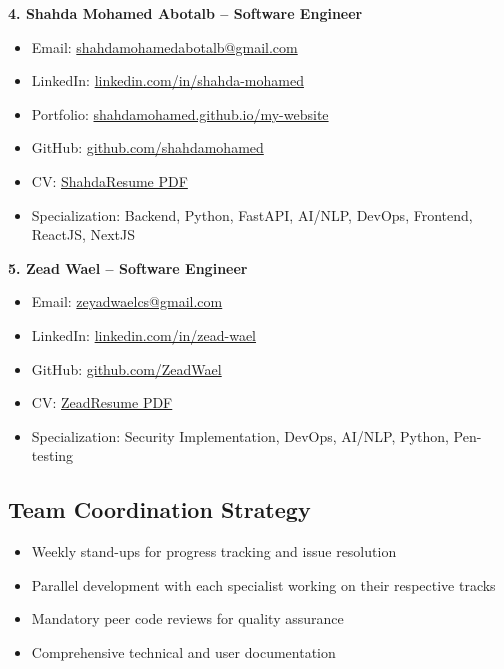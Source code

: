 \documentclass[12pt,a4paper]{article}
\begin{document}
\textbf{4. Shahda Mohamed Abotalb – Software Engineer}
\begin{itemize}
    \item Email: \href{mailto:shahdamohamedabotalb@gmail.com}{shahdamohamedabotalb@gmail.com}
    \item LinkedIn: \href{https://www.linkedin.com/in/shahda-mohamed-178537280}{linkedin.com/in/shahda-mohamed}
    \item Portfolio: \href{https://shahdamohamed.github.io/my-website}{shahdamohamed.github.io/my-website}
    \item GitHub: \href{https://github.com/shahdamohamed}{github.com/shahdamohamed}
    \item CV: \href{https://shahdamohamed.github.io/my-website/assets/resume.pdf}{ShahdaResume PDF}
    \item Specialization: Backend, Python, FastAPI, AI/NLP, DevOps, Frontend, ReactJS, NextJS
\end{itemize}

\textbf{5. Zead Wael – Software Engineer}
\begin{itemize}
    \item Email: \href{mailto:zeyadwaelcs@gmail.com}{zeyadwaelcs@gmail.com}
    \item LinkedIn: \href{https://www.linkedin.com/in/zead-wael}{linkedin.com/in/zead-wael}
    \item GitHub: \href{https://github.com/ZeadWael}{github.com/ZeadWael}
    \item CV: \href{https://drive.google.com/drive/folders/1mSTjcvvaDnJasdTxr2x36CddeTrQR5dQ?usp=sharing}{ZeadResume PDF}
    \item Specialization: Security Implementation, DevOps, AI/NLP, Python, Pen-testing
\end{itemize}

\subsection*{Team Coordination Strategy}
\begin{itemize}
    \item Weekly stand-ups for progress tracking and issue resolution
    \item Parallel development with each specialist working on their respective tracks
    \item Mandatory peer code reviews for quality assurance
    \item Comprehensive technical and user documentation
\end{itemize}
\end{document}
